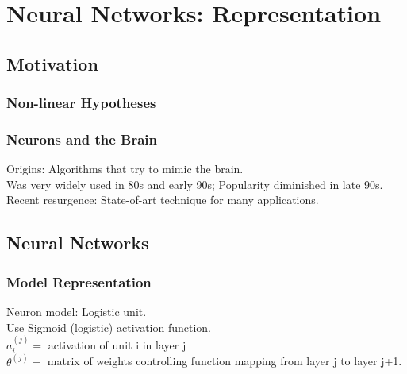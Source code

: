 \documentclass{article}
\begin{document}
\newpage

\section{Neural Networks: Representation}
\subsection{Motivation}
\subsubsection{Non-linear Hypotheses}
\subsubsection{Neurons and the Brain}
Origins: Algorithms that try to mimic the brain. \\
Was very widely used in 80s and early 90s; Popularity diminished in late 90s. \\
Recent resurgence: State-of-art technique for many applications.

\subsection{Neural Networks}
\subsubsection{Model Representation}
Neuron model: Logistic unit. \\
Use Sigmoid (logistic) activation function. \\

$a_i^{(j)} = $ activation of unit i in layer j\\
$\theta^{(j)} = $ matrix of weights controlling function mapping from layer j to layer j+1.\\

\\
\end{document}
